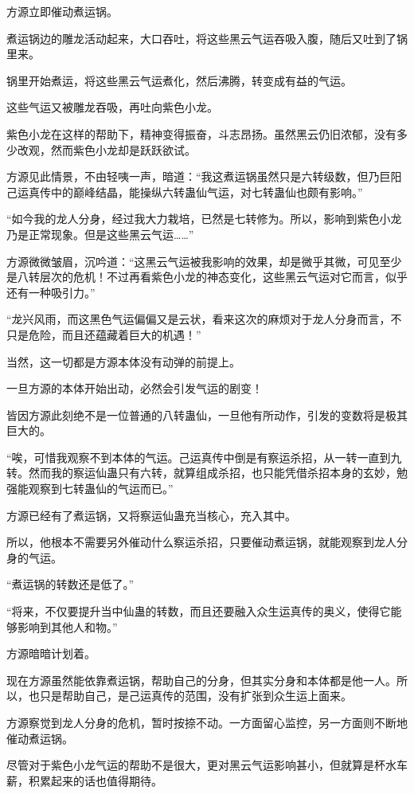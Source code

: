 \begin{this_body}
方源立即催动煮运锅。

煮运锅边的雕龙活动起来，大口吞吐，将这些黑云气运吞吸入腹，随后又吐到了锅里来。

锅里开始煮运，将这些黑云气运煮化，然后沸腾，转变成有益的气运。

这些气运又被雕龙吞吸，再吐向紫色小龙。

紫色小龙在这样的帮助下，精神变得振奋，斗志昂扬。虽然黑云仍旧浓郁，没有多少改观，然而紫色小龙却是跃跃欲试。

方源见此情景，不由轻咦一声，暗道：“我这煮运锅虽然只是六转级数，但乃巨阳己运真传中的巅峰结晶，能操纵六转蛊仙气运，对七转蛊仙也颇有影响。”

“如今我的龙人分身，经过我大力栽培，已然是七转修为。所以，影响到紫色小龙乃是正常现象。但是这些黑云气运……”

方源微微皱眉，沉吟道：“这黑云气运被我影响的效果，却是微乎其微，可见至少是八转层次的危机！不过再看紫色小龙的神态变化，这些黑云气运对它而言，似乎还有一种吸引力。”

“龙兴风雨，而这黑色气运偏偏又是云状，看来这次的麻烦对于龙人分身而言，不只是危险，而且还蕴藏着巨大的机遇！”

当然，这一切都是方源本体没有动弹的前提上。

一旦方源的本体开始出动，必然会引发气运的剧变！

皆因方源此刻绝不是一位普通的八转蛊仙，一旦他有所动作，引发的变数将是极其巨大的。

“唉，可惜我观察不到本体的气运。己运真传中倒是有察运杀招，从一转一直到九转。然而我的察运仙蛊只有六转，就算组成杀招，也只能凭借杀招本身的玄妙，勉强能观察到七转蛊仙的气运而已。”

方源已经有了煮运锅，又将察运仙蛊充当核心，充入其中。

所以，他根本不需要另外催动什么察运杀招，只要催动煮运锅，就能观察到龙人分身的气运。

“煮运锅的转数还是低了。”

“将来，不仅要提升当中仙蛊的转数，而且还要融入众生运真传的奥义，使得它能够影响到其他人和物。”

方源暗暗计划着。

现在方源虽然能依靠煮运锅，帮助自己的分身，但其实分身和本体都是他一人。所以，也只是帮助自己，是己运真传的范围，没有扩张到众生运上面来。

方源察觉到龙人分身的危机，暂时按捺不动。一方面留心监控，另一方面则不断地催动煮运锅。

尽管对于紫色小龙气运的帮助不是很大，更对黑云气运影响甚小，但就算是杯水车薪，积累起来的话也值得期待。


\end{this_body}
